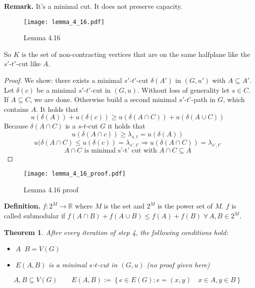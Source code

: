 \documentclass{article}
\newtheorem{theorem}{Theorem}
\newcommand{\set}[1]{\left\{#1\right\}}
\newcommand{\fall}{\;\forall\,}
\begin{document}
\textbf{Remark.}
  It's a minimal cut. It does not preserve capacity.

\begin{figure}[h]
 \begin{center}
  \texttt{[image: lemma\_4\_16.pdf]}
  \caption{Lemma 4.16}
 \end{center}
\end{figure}

So $K$ is the set of non-contracting vertices that are on the same halfplane like the $s'$-$t'$-cut like $A$.

\begin{proof}
  We show: there exists a minimal $s'$-$t'$-cut $\delta(A')$ in $(G, u')$ with $A \subseteq A'$.
  Let $\delta(c)$ be a minimal $s'$-$t'$-cut in $(G, u)$. Without loss of generality let $s \in C$.
  If $A \subseteq C$, we are done. Otherwise build a second minimal $s'$-$t'$-path in $G$, which contains $A$.
  It holds that
  \[
    u(\delta(A)) + u(\delta(c)) \geq u(\delta(A \cap C)) + u(\delta(A \cup C))
  \]
  Because $\delta(A \cap C)$ is a $s$-$t$-cut $G$ it holds that
  \[
    u(\delta(A \cap c)) \geq \lambda_{s,t} = u(\delta(A))
  \] \[
    u(\delta(A \cap C) \leq u(\delta(c)) = \lambda_{s',t'} \Rightarrow u(\delta(A \cap C)) = \lambda_{s',t'}
  \] \[
    A \cap C \text{ is minimal s'-t' cut with } A \cap C \subseteq A
  \]
\end{proof}

\begin{figure}[h]
 \begin{center}
  \texttt{[image: lemma\_4\_16\_proof.pdf]}
  \caption{Lemma 4.16 proof}
 \end{center}
\end{figure}

\textbf{Definition.}
  $f: 2^M \rightarrow \mathbb{R}$ where $M$ is the set and $2^M$ is the power set of $M$.
  $f$ is called submodular if $f(A \cap B) + f(A \cup B) \leq f(A) + f(B) \fall A, B \in 2^M$.

\begin{theorem}\label{lemma-4.17}
  After every iteration of step 4, the following conditions hold:
  \begin{itemize}
    \item $A \mathop{\dot{\cup}} B = V(G)$
    \item $E(A, B)$ is a minimal $s$-$t$-cut in $(G, u)$ (no proof given here)
  \end{itemize}
  \[
    A, B \subseteq V(G)  \qquad  E(A, B) := \set{e \in E(G): e = (x, y) \quad x \in A, y \in B}
  \]
\end{theorem}
\end{document}
